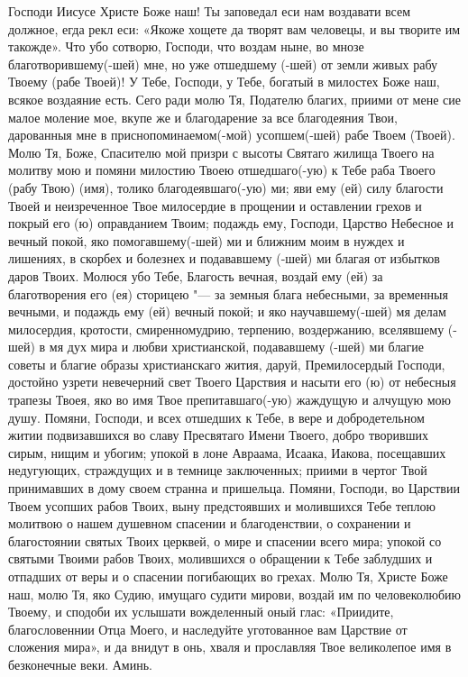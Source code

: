 \begin{mymulticols}
Господи Иисусе Христе Боже наш! Ты заповедал еси нам воздавати всем должное, егда рекл еси: «Якоже хощете да творят вам человецы, и вы творите им такожде». Что убо сотворю, Господи, что воздам ныне, во мнозе благотворившему(-шей) мне, но уже отшедшему (-шей) от земли живых рабу Твоему (рабе Твоей)! У Тебе, Господи, у Тебе, богатый в милостех Боже наш, всякое воздаяние есть. Сего ради молю Тя, Подателю благих, приими от мене сие малое моление мое, вкупе же и благодарение за все благодеяния Твои, дарованныя мне в приснопоминаемом(-мой) усопшем(-шей) рабе Твоем (Твоей). Молю Тя, Боже, Спасителю мой призри с высоты Святаго жилища Твоего на молитву мою и помяни милостию Твоею отшедшаго(-ую) к Тебе раба Твоего (рабу Твою) (имя), толико благодеявшаго(-ую) ми; яви ему (ей) силу благости Твоей и неизреченное Твое милосердие в прощении и оставлении грехов и покрый его (ю) оправданием Твоим; подаждь ему, Господи, Царство Небесное и вечный покой, яко помогавшему(-шей) ми и ближним моим в нуждех и лишениях, в скорбех и болезнех и подававшему (-шей) ми благая от избытков даров Твоих. Молюся убо Тебе, Благость вечная, воздай ему (ей) за благотворения его (ея) сторицею "--- за земныя блага небесными, за временныя вечными, и подаждь ему (ей) вечный покой; и яко научавшему(-шей) мя делам милосердия, кротости, смиренномудрию, терпению, воздержанию, вселявшему (-шей) в мя дух мира и любви христианской, подававшему (-шей) ми благие советы и благие образы христианскаго жития, даруй, Премилосердый Господи, достойно узрети невечерний свет Твоего Царствия и насыти его (ю) от небесныя трапезы Твоея, яко во имя Твое препитавшаго(-ую) жаждущую и алчущую мою душу. Помяни, Господи, и всех отшедших к Тебе, в вере и добродетельном житии подвизавшихся во славу Пресвятаго Имени Твоего, добро творивших сирым, нищим и убогим; упокой в лоне Авраама, Исаака, Иакова, посещавших недугующих, страждущих и в темнице заключенных; приими в чертог Твой принимавших в дому своем странна и пришельца. Помяни, Господи, во Царствии Твоем усопших рабов Твоих, выну предстоявших и молившихся Тебе теплою молитвою о нашем душевном спасении и благоденствии, о сохранении и благостоянии святых Твоих церквей, о мире и спасении всего мира; упокой со святыми Твоими рабов Твоих, молившихся о обращении к Тебе заблудших и отпадших от веры и о спасении погибающих во грехах. Молю Тя, Христе Боже наш, молю Тя, яко Судию, имущаго судити мирови, воздай им по человеколюбию Твоему, и сподоби их услышати вожделенный оный глас: «Приидите, благословеннии Отца Моего, и наследуйте уготованное вам Царствие от сложения мира», и да внидут в онь, хваля и прославляя Твое великолепое имя в безконечные веки. Аминь. 

\end{mymulticols}

